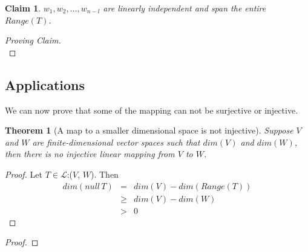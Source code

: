 \documentclass[a4paper,12pt,reqno,oneside]{amsart}
\newtheorem{theorem}{Theorem}
\theoremstyle{plain}
\newtheorem{claim}{Claim}
\numberwithin{equation}{section}
\begin{document}
	\begin{claim}
		$w_1, w_2, \ldots, w_{n-l}$ are linearly independent and span the entire $Range(T)$.
	\end{claim}
	\begin{proof}[Proving Claim]
		\\
	\end{proof}

\subsection{Applications}

We can now prove that some of the mapping can not be surjective or injective.
\begin{theorem}[A map to a smaller dimensional space is not injective]
	Suppose $V$ and $W$ are finite-dimensional vector spaces such that $dim(V)$ and
	\gtr $dim(W)$, then there is no injective linear mapping from $V$ to $W$.
\end{theorem}

\begin{proof}[Proof]
	Let $T\in\mathcal{L}$:($V$, $W$). Then
	\begin{eqnarray*}
	dim(null\,T)&=&dim(V) - dim(Range (T)) \\
	& \geq & dim(V) - dim(W) \\
	& > & 0
	\end{eqnarray*}
\end{proof}

\begin{proof}[Proof]
	
\end{proof}


\end{document}
